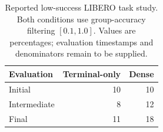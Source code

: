 \begin{table}[t]
\caption{Reported low-success LIBERO task study. Both conditions use group-accuracy filtering $[0.1,1.0]$. Values are percentages; evaluation timestamps and denominators remain to be supplied.}
\label{tab:libero_low}\centering\small
\begin{tabular}{@{}lrr@{}}\toprule
Evaluation & Terminal-only & Dense\\\midrule
Initial & 10 & 10\\
Intermediate & 8 & 12\\
Final & 11 & 18\\\bottomrule
\end{tabular}
\end{table}
